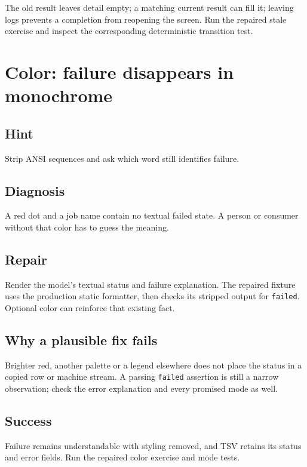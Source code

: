 The old result leaves detail empty; a matching current result can fill it; leaving logs prevents a completion from reopening the screen. Run the repaired stale exercise and inspect the corresponding deterministic transition test.

\section{Color: failure disappears in monochrome}

\subsection{Hint}

Strip ANSI sequences and ask which word still identifies failure.

\subsection{Diagnosis}

A red dot and a job name contain no textual failed state. A person or consumer without that color has to guess the meaning.

\subsection{Repair}

Render the model's textual status and failure explanation. The repaired fixture uses the production static formatter, then checks its stripped output for \texttt{failed}. Optional color can reinforce that existing fact.

\subsection{Why a plausible fix fails}

Brighter red, another palette or a legend elsewhere does not place the status in a copied row or machine stream. A passing \texttt{failed} assertion is still a narrow observation; check the error explanation and every promised mode as well.

\subsection{Success}

Failure remains understandable with styling removed, and TSV retains its status and error fields. Run the repaired color exercise and mode tests.


